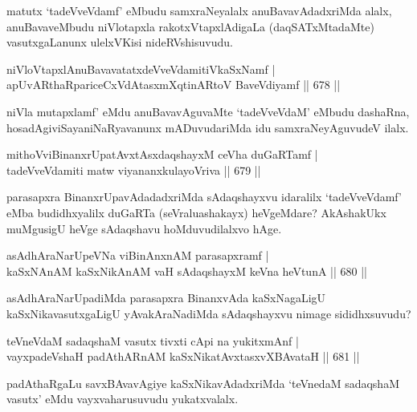\begin{artha}
matutx `tadeVveVdamf' eMbudu samxraNeyalalx anuBavavAdadxriMda alalx, anuBavaveMbudu niVlotapxla rakotxVtapxlAdigaLa (daqSATxMtadaMte) vasutxgaLanunx ulelxVKisi nideRVshisuvudu.
\end{artha}

\begin{shl}
niVloVtapxlAnuBavavatatxdeVveVdamitiVkaSxNamf | \\
apUvARthaRpariceCxVdAtasxmXqtinARtoV BaveVdiyamf \hfill||  678 ||  
\end{shl}

\begin{artha}
niVla mutapxlamf' eMdu anuBavavAguvaMte `tadeVveVdaM' eMbudu dashaRna, hosadAgiviSayaniNaRyavanunx mADuvudariMda idu samxraNeyAguvudeV ilalx.
\end{artha}

\begin{shl}
mithoVviBinanxrUpatAvxtAsxdaqshayxM ceVha duGaRTamf | \\
tadeVveVdamiti matw viyananxkulayoVriva \hfill||  679 ||  
\end{shl}

\begin{artha}
parasapxra BinanxrUpavAdadadxriMda sAdaqshayxvu idaralilx `tadeVveVdamf' eMba budidhxyalilx duGaRTa (seVraluashakayx) heVgeMdare? AkAshakUkx muMgusigU heVge sAdaqshavu hoMduvudilalxvo hAge.
\end{artha}

\begin{shl}
asAdhAraNarUpeVNa viBinAnxnAM parasapxramf | \\
kaSxNAnAM kaSxNikAnAM vaH sAdaqshayxM keVna heVtunA \hfill||  680 ||  
\end{shl}

\begin{artha}
asAdhAraNarUpadiMda parasapxra BinanxvAda kaSxNagaLigU kaSxNikavasutxgaLigU yAvakAraNadiMda sAdaqshayxvu nimage sididhxsuvudu? 
\end{artha}


\begin{shl}
teVneVdaM sadaqshaM vasutx tivxti cApi na yukitxmAnf | \\
vayxpadeVshaH padAthARnAM kaSxNikatAvxtasxvXBAvataH \hfill||  681 ||  
\end{shl}

\begin{artha}
padAthaRgaLu savxBAvavAgiye kaSxNikavAdadxriMda `teVnedaM sadaqshaM vasutx' eMdu vayxvaharusuvudu yukatxvalalx.
\end{artha}

